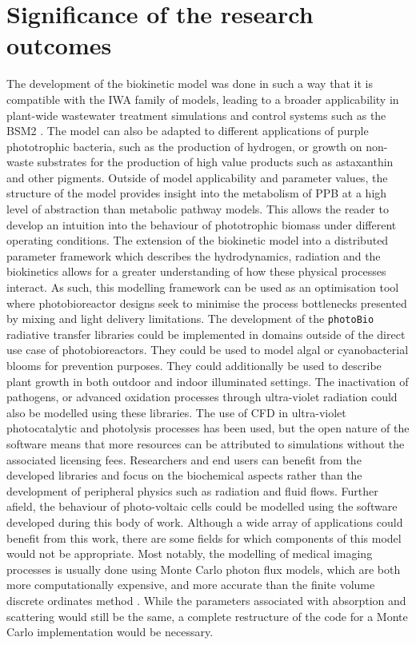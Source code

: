 \section{Significance of the research outcomes}
The development of the biokinetic model was done in such a way that it is compatible with the IWA family of models, leading to a broader applicability in plant-wide wastewater treatment simulations and control systems such as the BSM2 \cite{jeppsson2007}. The model can also be adapted to different applications of purple phototrophic bacteria, such as the production of hydrogen, or growth on non-waste substrates for the production of high value products such as astaxanthin and other pigments. Outside of model applicability and parameter values, the structure of the model provides insight into the metabolism of PPB at a high level of abstraction than metabolic pathway models. This allows the reader to develop an intuition into the behaviour of phototrophic biomass under different operating conditions. 
\skippingparagraph
The extension of the biokinetic model into a distributed parameter framework which describes the hydrodynamics, radiation and the biokinetics allows for a greater understanding of how these physical processes interact. As such, this modelling framework can be used as an optimisation tool where photobioreactor designs seek to minimise the process bottlenecks presented by mixing and light delivery limitations. The development of the \texttt{photoBio} radiative transfer libraries could be implemented in domains outside of the direct use case of photobioreactors. They could be used to model algal or cyanobacterial blooms for prevention purposes. They could additionally be used to describe plant growth in both outdoor and indoor illuminated settings. The inactivation of pathogens, or advanced oxidation processes through ultra-violet radiation could also be modelled using these libraries. The use of CFD in ultra-violet photocatalytic and photolysis processes has been used, but the open nature of the software means that more resources can be attributed to simulations without the associated licensing fees. Researchers and end users can benefit from the developed libraries and focus on the biochemical aspects rather than the development of peripheral physics such as radiation and fluid flows. Further afield, the behaviour of photo-voltaic cells could be modelled using the software developed during this body of work. Although a wide array of applications could benefit from this work, there are some fields for which components of this model would not be appropriate. Most notably, the modelling of medical imaging processes is usually done using Monte Carlo photon flux models, which are both more computationally expensive, and more accurate than the finite volume discrete ordinates method \cite{dauchet2013}. While the parameters associated with absorption and scattering would still be the same, a complete restructure of the code for a Monte Carlo implementation would be necessary.
